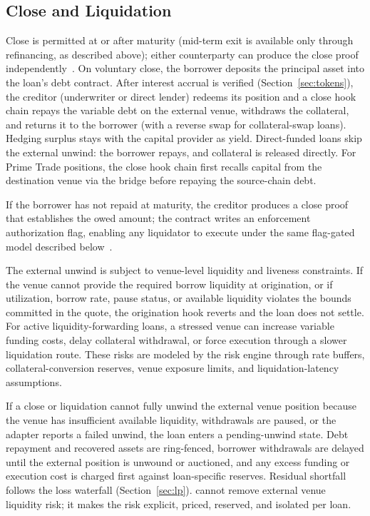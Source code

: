 \subsection{Close and Liquidation}

Close is permitted at or after maturity (mid-term exit is available only through refinancing, as described above); either counterparty can produce the close proof independently~\cite{daloc-decent2026}. On voluntary close, the borrower deposits the principal asset into the loan's debt contract. After interest accrual is verified (Section~\ref{sec:tokens}), the creditor (underwriter or direct lender) redeems its position and a close hook chain repays the variable debt on the external venue, withdraws the collateral, and returns it to the borrower (with a reverse swap for collateral-swap loans). Hedging surplus stays with the capital provider as yield. Direct-funded loans skip the external unwind: the borrower repays, and collateral is released directly. For Prime Trade positions, the close hook chain first recalls capital from the destination venue via the bridge before repaying the source-chain debt.

If the borrower has not repaid at maturity, the creditor produces a close proof that establishes the owed amount; the contract writes an enforcement authorization flag, enabling any liquidator to execute under the same flag-gated model described below~\cite{daloc-decent2026}.

The external unwind is subject to venue-level liquidity and liveness constraints. If the venue cannot provide the required borrow liquidity at origination, or if utilization, borrow rate, pause status, or available liquidity violates the bounds committed in the quote, the origination hook reverts and the loan does not settle. For active liquidity-forwarding loans, a stressed venue can increase variable funding costs, delay collateral withdrawal, or force execution through a slower liquidation route. These risks are modeled by the risk engine through rate buffers, collateral-conversion reserves, venue exposure limits, and liquidation-latency assumptions.

If a close or liquidation cannot fully unwind the external venue position because the venue has insufficient available liquidity, withdrawals are paused, or the adapter reports a failed unwind, the loan enters a pending-unwind state. Debt repayment and recovered assets are ring-fenced, borrower withdrawals are delayed until the external position is unwound or auctioned, and any excess funding or execution cost is charged first against loan-specific reserves. Residual shortfall follows the loss waterfall (Section~\ref{sec:lp}). \daloc{} cannot remove external venue liquidity risk; it makes the risk explicit, priced, reserved, and isolated per loan.

